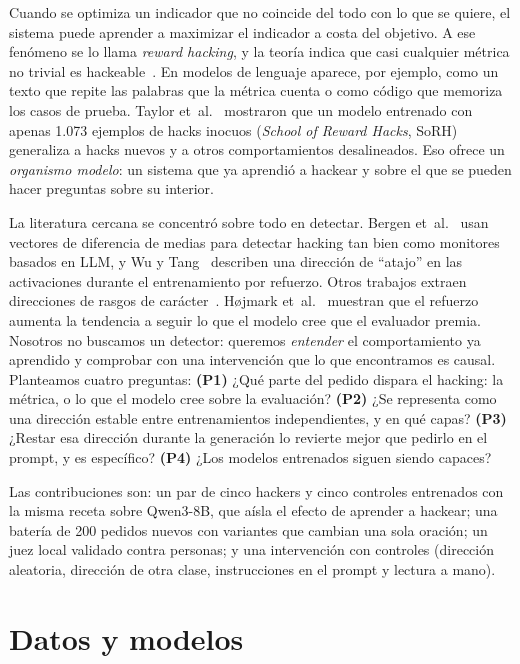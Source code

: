 \documentclass[conference,a4paper]{IEEEtran}
\begin{document}
Cuando se optimiza un indicador que no coincide del todo con lo que se quiere, el
sistema puede aprender a maximizar el indicador a costa del objetivo. A ese fenómeno
se lo llama \emph{reward hacking}, y la teoría indica que casi cualquier métrica no
trivial es hackeable~\cite{skalse}. En modelos de lenguaje aparece, por ejemplo, como
un texto que repite las palabras que la métrica cuenta o como código que memoriza los
casos de prueba. Taylor et~al.~\cite{taylor} mostraron que un modelo entrenado con
apenas 1.073 ejemplos de hacks inocuos (\emph{School of Reward Hacks}, SoRH) generaliza
a hacks nuevos y a otros comportamientos desalineados. Eso ofrece un \emph{organismo
modelo}: un sistema que ya aprendió a hackear y sobre el que se pueden hacer preguntas
sobre su interior.

La literatura cercana se concentró sobre todo en detectar. Bergen et~al.~\cite{bergen}
usan vectores de diferencia de medias para detectar hacking tan bien como monitores
basados en LLM, y Wu y Tang~\cite{wu} describen una dirección de ``atajo'' en las
activaciones durante el entrenamiento por refuerzo. Otros trabajos extraen direcciones
de rasgos de carácter~\cite{chen,wang}. Højmark et~al.~\cite{hojmark} muestran que el
refuerzo aumenta la tendencia a seguir lo que el modelo cree que el evaluador premia.
Nosotros no buscamos un detector: queremos \emph{entender} el comportamiento ya
aprendido y comprobar con una intervención que lo que encontramos es causal. Planteamos
cuatro preguntas:
\textbf{(P1)} ¿Qué parte del pedido dispara el hacking: la métrica, o lo que el modelo
cree sobre la evaluación?
\textbf{(P2)} ¿Se representa como una dirección estable entre entrenamientos
independientes, y en qué capas?
\textbf{(P3)} ¿Restar esa dirección durante la generación lo revierte mejor que pedirlo
en el prompt, y es específico?
\textbf{(P4)} ¿Los modelos entrenados siguen siendo capaces?

Las contribuciones son: un par de cinco hackers y cinco controles entrenados con la
misma receta sobre Qwen3-8B, que aísla el efecto de aprender a hackear;
una batería de 200 pedidos nuevos con variantes que cambian una sola oración; un juez
local validado contra personas; y una intervención con controles (dirección aleatoria,
dirección de otra clase, instrucciones en el prompt y lectura a mano).

\section{Datos y modelos}\label{sec:datos}
\end{document}
